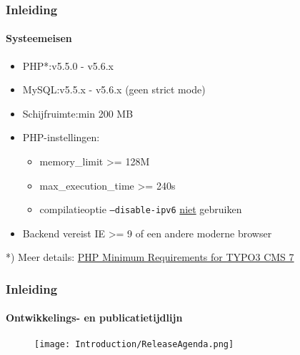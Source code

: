 \begin{frame}[fragile]
	\frametitle{Inleiding}
	\framesubtitle{Systeemeisen}

	\begin{itemize}
		\item PHP*:\tabto{2.2cm}v5.5.0 - v5.6.x
		\item MySQL:\tabto{2.2cm}v5.5.x - v5.6.x (geen strict mode)
		\item Schijfruimte:\tabto{2.2cm}min 200 MB
		\item PHP-instellingen:

			\begin{itemize}
				\item memory\_limit >= 128M
				\item max\_execution\_time >= 240s
				\item compilatieoptie \texttt{--disable-ipv6} \underline{niet} gebruiken
			\end{itemize}

		\item Backend vereist IE >= 9 of een andere moderne browser

	\end{itemize}

	\vspace{1cm}

	*) Meer details: \href{http://typo3.org/news/article/php-minimum-requirements-for-typo3-cms-7/}{PHP Minimum Requirements for TYPO3 CMS 7}

\end{frame}

\begin{frame}[fragile]
	\frametitle{Inleiding}
	\framesubtitle{Ontwikkelings- en publicatietijdlijn}

	\begin{figure}
		\texttt{[image: Introduction/ReleaseAgenda.png]}
	\end{figure}

\end{frame}

